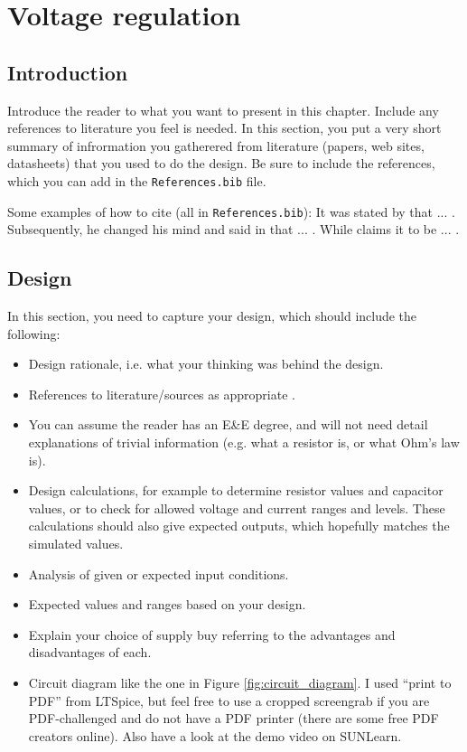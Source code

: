 \chapter{Voltage regulation}\label{ch:voltageRegulation}

\section{Introduction} \label{sec:voltIntro}


Introduce the reader to what you want to present in this chapter. Include any references to literature you feel is needed. 
In this section, you put a very short summary of infrormation you gatherered from literature (papers, web sites, datasheets) that you used to do the design. Be sure to include the references, which you can add in the \texttt{References.bib} file. 

Some examples of how to cite (all in \texttt{References.bib}): 
It was stated by \cite{Booysen:2013} that ... . Subsequently, he changed his mind and said in  \cite{Gerber:2019} that ... .
While \cite{WebsiteOpAmp} claims it to be ... .


\section{Design} \label{sec:voltDesign}

In this section, you need to capture your design, which should include the following: 
\begin{itemize}
  \item Design rationale, i.e. what your thinking was behind the design.
  \item References to literature/sources as appropriate \cite{WebsiteOpAmp}.  
  \item You can assume the reader has an E\&E degree, and will not need detail explanations of trivial information (e.g. what a resistor is, or what Ohm's law is).  
  \item Design calculations, for example to determine resistor values and capacitor values, or to check for allowed voltage and current ranges and levels. These calculations should also give expected outputs, which hopefully matches the simulated values. 
  \item Analysis of given or expected input conditions. 
  \item Expected values and ranges based on your design. 
  \item Explain your choice of supply buy referring to the advantages and disadvantages of each. 
  \item Circuit diagram like the one in Figure \ref{fig:circuit_diagram}. I used ``print to PDF'' from LTSpice,  but feel free to use a cropped screengrab if you are PDF-challenged and do not have a PDF printer (there are some free PDF creators online). Also have a look at the demo video on SUNLearn. 
\end{itemize}

